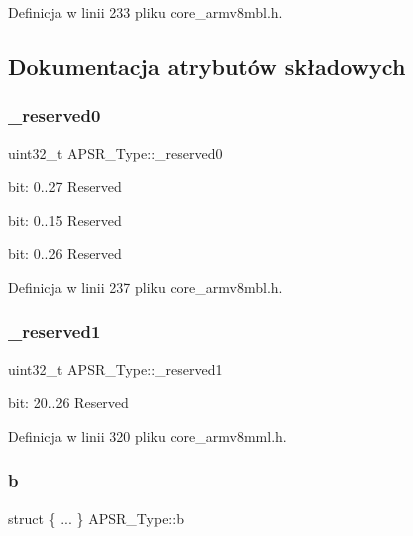 Definicja w linii 233 pliku core\+\_\+armv8mbl.\+h.



\subsection{Dokumentacja atrybutów składowych}
\mbox{\label{union_a_p_s_r___type_afbce95646fd514c10aa85ec0a33db728}} 
\subsubsection{\texorpdfstring{\+\_\+reserved0}{\_reserved0}}
{\footnotesize\ttfamily uint32\+\_\+t A\+P\+S\+R\+\_\+\+Type\+::\+\_\+reserved0}

bit\+: 0..27 Reserved

bit\+: 0..15 Reserved

bit\+: 0..26 Reserved 

Definicja w linii 237 pliku core\+\_\+armv8mbl.\+h.

\mbox{\label{union_a_p_s_r___type_ac681f266e20b3b3591b961e13633ae13}} 
\subsubsection{\texorpdfstring{\+\_\+reserved1}{\_reserved1}}
{\footnotesize\ttfamily uint32\+\_\+t A\+P\+S\+R\+\_\+\+Type\+::\+\_\+reserved1}

bit\+: 20..26 Reserved 

Definicja w linii 320 pliku core\+\_\+armv8mml.\+h.

\mbox{\label{union_a_p_s_r___type_a99c3ab089dde40ee2a043b340006df66}} 
\subsubsection{\texorpdfstring{b}{b}\hspace{0.1cm}{\footnotesize\ttfamily [1/12]}}
{\footnotesize\ttfamily struct \{ ... \}   A\+P\+S\+R\+\_\+\+Type\+::b}

